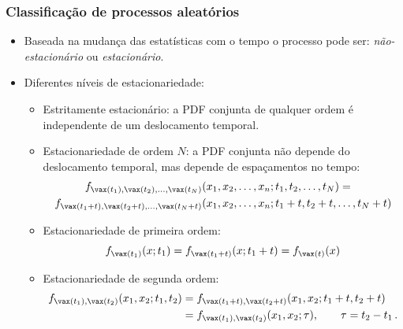 \begin{frame}
    \frametitle{Classificação de processos aleatórios}

    \begin{itemize}
     \item Baseada na mudança das estatísticas com o tempo o processo pode ser: \textit{não-estacionário} ou \textit{estacionário}.
      \item Diferentes níveis de estacionariedade:
      \begin{itemize}
       \item Estritamente estacionário: a PDF conjunta de qualquer ordem é independente de um deslocamento temporal.
	\item Estacionariedade de ordem $N$: a PDF conjunta não depende do deslocamento temporal, mas depende de espaçamentos no tempo:
	\begin{align*}
	  f_{\vax(t_1),\vax(t_2),\ldots,\vax(t_N)}&(x_1,x_2,\ldots,x_n; t_1,t_2,\ldots,t_N) = \\
	  f_{\vax(t_1+t),\vax(t_2+t),\ldots,\vax(t_N+t)}&(x_1,x_2,\ldots,x_n; t_1+t,t_2+t,\ldots,t_N+t)
	\end{align*}
	\item Estacionariedade de primeira ordem:
	\begin{equation}
	  f_{\vax(t_1)}(x; t_1) = f_{\vax(t_1+t)}(x; t_1+t) = f_{\vax(t)}(x)
	\end{equation}
	\item Estacionariedade de segunda ordem:
	\begin{align*}
	  f_{\vax(t_1),\vax(t_2)}(x_1,x_2; t_1,t_2) &= f_{\vax(t_1+t),\vax(t_2+t)}(x_1,x_2; t_1+t, t_2+t) \\
	  &= f_{\vax(t_1),\vax(t_2)}(x_1,x_2; \tau), \qquad \tau = t_2 - t_1 \, .
	\end{align*}

      \end{itemize}

    \end{itemize}
     
\end{frame}


